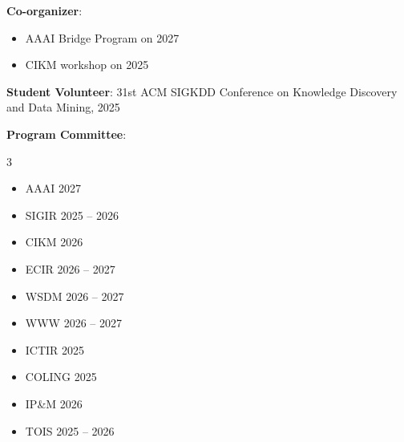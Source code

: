 \documentclass[]{resume-openfont}
\begin{document}
\begin{bullets}[leftmargin=*]
    \item {\color{headingtext}\textbf{Co-organizer}:}
      \begin{itemize}[label=]
        \item AAAI Bridge Program on  \hfill 2027
        \item CIKM workshop on  \hfill 2025 
      \end{itemize}
    \item {\color{headingtext}\textbf{Student Volunteer}:} 31st ACM SIGKDD Conference on Knowledge Discovery and Data Mining, 2025 
    \item {\color{headingtext}\textbf{Program Committee}:}
      \vspace{-8pt}
      \begin{multicols}{3}
        \begin{itemize}[label=]
          \item AAAI 2027
          \item SIGIR 2025 -- 2026
          \item CIKM 2026
          \item ECIR 2026 -- 2027
          \item WSDM 2026 -- 2027
          \item WWW 2026 -- 2027
          \item ICTIR 2025
          \item COLING 2025
          \item IP\&M 2026
          \item TOIS 2025 -- 2026
        \end{itemize}
      \end{multicols}
      
\end{bullets}
\end{document}
